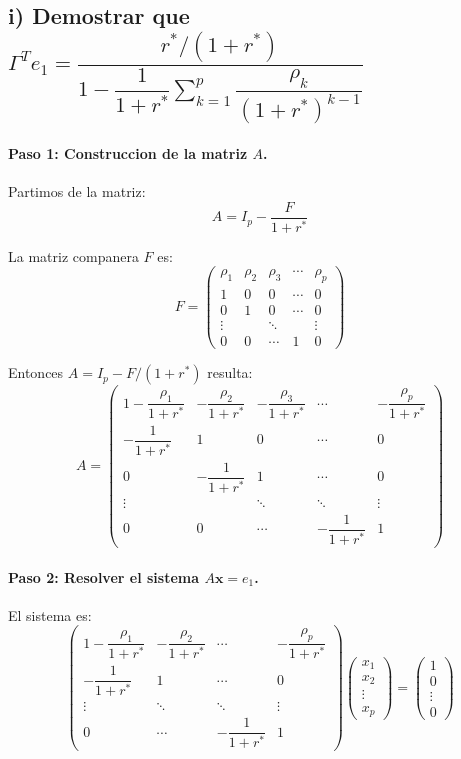 \subsection*{i) Demostrar que $\Gamma^T e_1 = \dfrac{r^*/(1+r^*)}{1 - \dfrac{1}{1+r^*}\sum_{k=1}^{p} \dfrac{\rho_k}{(1+r^*)^{k-1}}}$}

\paragraph{Paso 1: Construccion de la matriz $A$.}

Partimos de la matriz:
\[
    A = I_p - \frac{F}{1+r^*}
\]

La matriz companera $F$ es:
\[
    F = \begin{pmatrix}
        \rho_1 & \rho_2 & \rho_3 & \cdots & \rho_p \\
        1 & 0 & 0 & \cdots & 0 \\
        0 & 1 & 0 & \cdots & 0 \\
        \vdots & & \ddots & & \vdots \\
        0 & 0 & \cdots & 1 & 0
    \end{pmatrix}
\]

Entonces $A = I_p - F/(1+r^*)$ resulta:
\[
    A = \begin{pmatrix}
        1 - \dfrac{\rho_1}{1+r^*} & -\dfrac{\rho_2}{1+r^*} & -\dfrac{\rho_3}{1+r^*} & \cdots & -\dfrac{\rho_p}{1+r^*} \\[8pt]
        -\dfrac{1}{1+r^*} & 1 & 0 & \cdots & 0 \\[8pt]
        0 & -\dfrac{1}{1+r^*} & 1 & \cdots & 0 \\[4pt]
        \vdots & & \ddots & \ddots & \vdots \\[4pt]
        0 & 0 & \cdots & -\dfrac{1}{1+r^*} & 1
    \end{pmatrix}
\]

\paragraph{Paso 2: Resolver el sistema $A\mathbf{x} = e_1$.}

El sistema es:
\[
    \begin{pmatrix}
        1 - \dfrac{\rho_1}{1+r^*} & -\dfrac{\rho_2}{1+r^*} & \cdots & -\dfrac{\rho_p}{1+r^*} \\[8pt]
        -\dfrac{1}{1+r^*} & 1 & \cdots & 0 \\[4pt]
        \vdots & \ddots & \ddots & \vdots \\[4pt]
        0 & \cdots & -\dfrac{1}{1+r^*} & 1
    \end{pmatrix}
    \begin{pmatrix} x_1 \\ x_2 \\ \vdots \\ x_p \end{pmatrix}
    = \begin{pmatrix} 1 \\ 0 \\ \vdots \\ 0 \end{pmatrix}
\]

